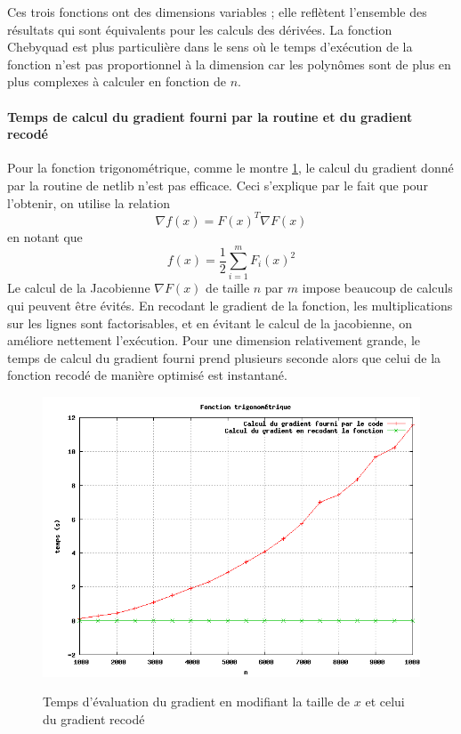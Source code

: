 Ces trois fonctions ont des dimensions variables ; elle refl\`etent l'ensemble des r\'esultats qui sont \'equivalents pour les calculs des d\'eriv\'ees.
La fonction Chebyquad est plus particuli\`ere dans le sens o\`u le temps d'ex\'ecution de la fonction n'est pas proportionnel
\`a la dimension car les polynômes sont de plus en plus complexes \`a calculer en fonction de $n$. 





\paragraph{Temps de calcul du gradient fourni par la routine et du gradient recod\'e}
 Pour la fonction trigonom\'etrique, comme le montre \ref{fig:temps14},
 le calcul du gradient donn\'e par la routine de netlib n'est pas 
efficace. Ceci s'explique par le fait que pour l'obtenir, on utilise la relation $$ \nabla f(x)=F(x)^T\nabla F(x)$$ en notant que 
$$f(x)= \frac{1}{2}\sum_{i=1}^{m}F_i(x)^2$$
Le calcul de la Jacobienne $\nabla F(x)$ de taille $n$ par $m$ impose beaucoup de calculs qui peuvent être \'evit\'es.
En recodant le gradient de la fonction, les multiplications sur les lignes sont factorisables, et en \'evitant le calcul de la 
jacobienne, on am\'eliore nettement l'ex\'ecution. {\co Pour une dimension relativement grande, le temps de calcul du gradient fourni prend plusieurs seconde 
alors que celui de la fonction recod\'e de mani\`ere optimis\'e est instantan\'e.}




\begin{figure}
\caption{Temps d'\'evaluation du gradient en modifiant la taille
de $x$ et celui du gradient recod\'e}
\center
\includegraphics[scale=0.4]{figures/temps14.png}
\label{fig:temps14}
\end{figure}


